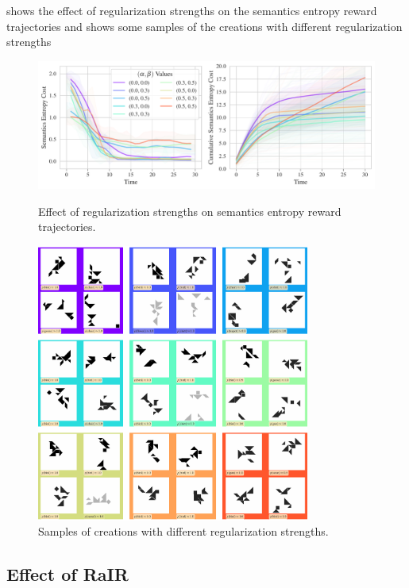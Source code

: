  shows the effect of regularization strengths on the semantics entropy reward trajectories and  shows some samples of the creations with different regularization strengths

\begin{figure}[H]
    \centering
    \includegraphics[width=\textwidth]{images/alpha_beta_comparison_rair.pdf}
    \caption{Effect of regularization strengths on semantics entropy reward trajectories.}
    \label{fig:alpha-beta-trajectories}
    \vspace{12pt}
    \includegraphics[width=0.8\textwidth]{images/alpha_beta_rair_samples.pdf}
    \caption{Samples of creations with different regularization strengths.}
    \label{fig:alpha-beta-samples}
\end{figure}

\newpage
\subsection{Effect of RaIR}
\label{sec:effect-rair}

